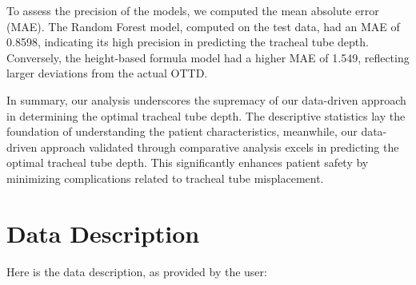 \documentclass[11pt]{article}
\begin{document}
To assess the precision of the models, we computed the mean absolute error (MAE). The Random Forest model, computed on the test data, had an MAE of 0.8598, indicating its high precision in predicting the tracheal tube depth. Conversely, the height-based formula model had a higher MAE of 1.549, reflecting larger deviations from the actual OTTD. 

In summary, our analysis underscores the supremacy of our data-driven approach in determining the optimal tracheal tube depth. The descriptive statistics lay the foundation of understanding the patient characteristics, meanwhile, our data-driven approach validated through comparative analysis excels in predicting the optimal tracheal tube depth. This significantly enhances patient safety by minimizing complications related to tracheal tube misplacement.


\clearpage
\appendix

\section{Data Description} \label{sec:data_description} Here is the data description, as provided by the user:
\end{document}
